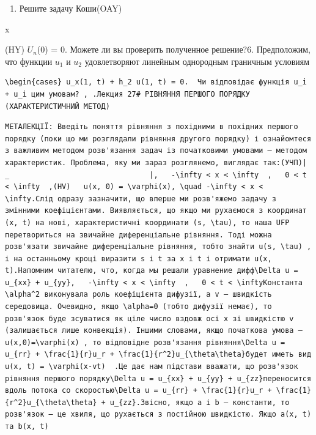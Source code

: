 \documentclass[
  ukrainian,
]{article}
\providecommand{\tightlist}{%
  \setlength{\itemsep}{0pt}\setlength{\parskip}{0pt}}
\begin{document}
\begin{enumerate}
\def\labelenumi{\arabic{enumi}.}
\setcounter{enumi}{4}
\tightlist
\item
  Решите задачу Коши(OAY)
\end{enumerate}

x

(HY) \(U_n\)(0) = 0. Можете ли вы проверить полученное решение?6.
Предположим, что функции \(u_1\) и \(u_2\) удовлетворяют линейным
однородным граничным условиям

\begin{verbatim}
\begin{cases} u_x(1, t) + h_2 u(1, t) = 0.  Чи відповідає функція u_i + u_i цим умовам? , .Лекция 27# РІВНЯННЯ ПЕРШОГО ПОРЯДКУ (ХАРАКТЕРИСТИЧНИЙ МЕТОД)
\end{verbatim}

\begin{verbatim}
МЕТАЛЕКЦІЇ: Введіть поняття рівняння з похідними в похідних першого порядку (поки що ми розглядали рівняння другого порядку) і ознайомтеся з важливим методом розв'язання задач із початковими умовами — методом характеристик. Проблема, яку ми зараз розглянемо, виглядає так:(УЧП)| _                                |,   -\infty < x < \infty  ,   0 < t < \infty  ,(HV)   u(x, 0) = \varphi(x), \quad -\infty < x < \infty.Слід одразу зазначити, що вперше ми розв'яжемо задачу з змінними коефіцієнтами. Виявляється, що якщо ми рухаємося з координат (x, t) на нові, характеристичні координати (s, \tau), то наша UFP перетвориться на звичайне диференціальне рівняння. Тоді можна розв'язати звичайне диференціальне рівняння, тобто знайти u(s, \tau) , і на останньому кроці виразити s і t за x і t і отримати u(x, t).Напомним читателю, что, когда мы решали уравнение дифф\Delta u = u_{xx} + u_{yy},   -\infty < x < \infty  ,   0 < t < \inftyКонстанта \alpha^2 виконувала роль коефіцієнта дифузії, а v — швидкість середовища. Очевидно, якщо \alpha=0 (тобто дифузії немає), то розв'язок буде зсуватися як ціле число вздовж осі x зі швидкістю v (залишається лише конвекція). Іншими словами, якщо початкова умова — u(x,0)=\varphi(x) , то відповідне розв'язання рівняння\Delta u = u_{rr} + \frac{1}{r}u_r + \frac{1}{r^2}u_{\theta\theta}будет иметь вид   u(x, t) = \varphi(x-vt)  .Це дає нам підстави вважати, що розв'язок рівняння першого порядку\Delta u = u_{xx} + u_{yy} + u_{zz}переносится вдоль потока со скоростью\Delta u = u_{rr} + \frac{1}{r}u_r + \frac{1}{r^2}u_{\theta\theta} + u_{zz}.Звісно, якщо a і b — константи, то розв'язок — це хвиля, що рухається з постійною швидкістю. Якщо a(x, t) та b(x, t)
\end{verbatim}
\end{document}
